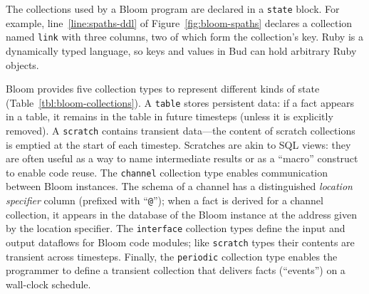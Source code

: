 The collections
used by a Bloom program are declared in a \texttt{state} block. For example,
line~\ref{line:spaths-ddl} of Figure~\ref{fig:bloom-spaths} declares a
collection named \texttt{link} with three columns, two of which form the
collection's key. Ruby is a dynamically typed language, so keys and values in
Bud can hold arbitrary Ruby objects.

Bloom provides five collection types to represent different kinds of state
(Table~\ref{tbl:bloom-collections}). A \texttt{table} stores persistent data: if
a fact appears in a table, it remains in the table in future timesteps (unless it
is explicitly removed). A \texttt{scratch} contains transient data---the content
of scratch collections is emptied at the start of each timestep. Scratches are
akin to SQL views: they are often useful as a way to name intermediate results
or as a ``macro'' construct to enable code reuse. The \texttt{channel}
collection type enables communication between Bloom instances. The schema of a
channel has a distinguished \emph{location specifier} column (prefixed with
``\texttt{@}''); when a fact is derived for a channel collection, it appears in
the database of the Bloom instance at the address given by the location
specifier. The \texttt{interface} collection types define the input and output dataflows for Bloom code modules; like \texttt{scratch} types their contents are transient across timesteps.  Finally, the \texttt{periodic} collection type enables the programmer to define a transient collection that delivers facts (``events'') on a wall-clock schedule.

